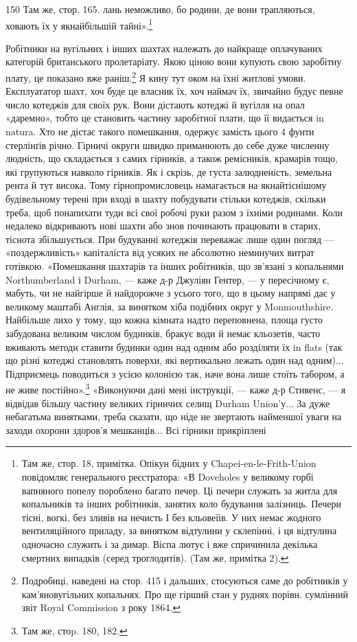 150 Там же, стор. 165.
лань неможливо, бо родини, де вони трапляються, ховають їх
у якнайбільшій тайні».\footnote{
Там же, стор. 18, примітка. Опікун бідних у Chapei-en-le-Frith-Union
повідомляє генерального реєстратора: «В Doveholes у великому
горбі вапняного попелу пороблено багато печер. Ці печери служать
за житла для копальників та інших робітників, занятих коло будування
залізниць. Печери тісні, вогкі, без зливів на нечисть І без кльовеїів.
У них немає жодного вентиляційного приладу, за винятком відтулини у
склепінні, і ця відтулина одночасно служить і за димар. Віспа лютує і
вже спричинила декілька смертних випадків (серед троглодитів). (Там же,
примітка 2).
}

Робітники на вугільних і інших шахтах належать до найкраще
оплачуваних категорій британського пролетаріату. Якою ціною
вони купують свою заробітну плату, це показано вже раніш.\footnote{
Подробиці, наведені на стор. 415 і дальших, стосуються саме до
робітників у кам'яновугільних копальнях. Про ще гірший стан у руднях
порівн. сумлінний звіт Royal Commission з року 1864.
}
Я кину тут оком на їхні житлові умови. Експлуататор шахт,
хоч буде це власник їх, хоч наймач їх, звичайно будує певне
число котеджів для своїх рук. Вони дістають котеджі й вугілля
на опал «даремно», тобто це становить частину заробітної плати,
що її видається in natura. Хто не дістає такого помешкання,
одержує замість цього 4 фунти стерлінґів річно. Гірничі округи
швидко приманюють до себе дуже численну людність, що складається
з самих гірників, а також ремісників, крамарів тощо,
які групуються навколо гірників. Як і скрізь, де густа залюдненість,
земельна рента й тут висока. Тому гірнопромисловець
намагається на якнайтіснішому будівельному терені при вході
в шахту побудувати стільки котеджів, скільки треба, щоб понапихати
туди всі свої робочі руки разом з їхніми родинами.
Коли недалеко відкривають нові шахти або знов починають
працювати в старих, тіснота збільшується. При будуванні котеджів
переважає лише один погляд — «поздержливість» капіталіста
від усяких не абсолютно неминучих витрат готівкою.
«Помешкання шахтарів та інших робітників, що зв’язані з копальнями
Northumberland і Durham, — каже д-р Джуліян Гентер,
— у пересічному є, мабуть, чи не найгірше й найдорожче
з усього того, що в цьому напрямі дає у великому маштабі
Англія, за винятком хіба подібних округ у Monmouthshire. Найбільше
лихо у тому, що кожна кімната надто переповнена, площа
густо забудована великим числом будинків, бракує води й
немає кльозетів, часто вживають методи ставити будинки один
над одним або розділяти їх in flats (так що різні котеджі становлять
поверхи, які вертикально лежать один над одним)... Підприємець
поводиться з усією колонією так, наче вона лише стоїть
табором, а не живе постійно».\footnote{
Там же, стоp. 180, 182.
} «Виконуючи дані мені інструкції,
— каже д-р Стивенс, — я відвідав більшу частину великих
гірничих селищ Durham Union’у... За дуже небагатьма винятками,
треба сказати, що ніде не звертають найменшої уваги на
заходи охорони здоров’я мешканців... Всі гірники прикріплені
\parbreak{}  %
